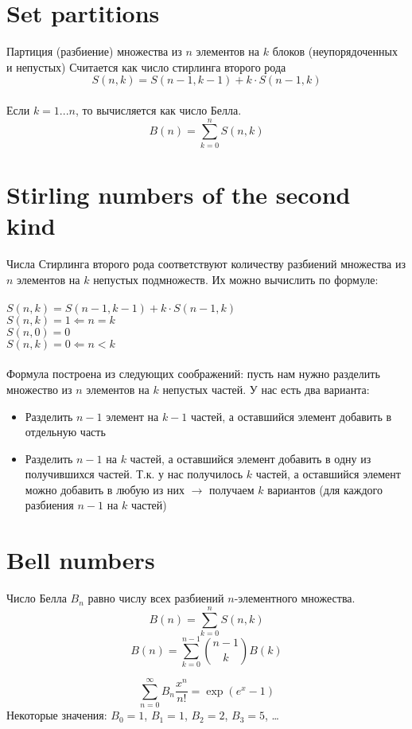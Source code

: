 \documentclass{article}
\begin{document}
	\section{Set partitions}
	Партиция (разбиение) множества из $n$ элементов на $k$ блоков (неупорядоченных и непустых) Считается как число стирлинга второго рода
	\[S(n,k) = S(n-1,k-1) + k \cdot S(n-1, k)\]
	\\
	Если $k = 1...n$, то вычисляется как число Белла.
	\[B(n) = \sum_{k=0}^{n} S(n,k)\]
	
	\section{Stirling numbers of the second kind}
	Числа Стирлинга второго рода соответствуют количеству разбиений множества из $n$ элементов на $k$ непустых подмножеств. Их можно вычислить по формуле:\\
	\\
	\(S(n,k) = S(n-1,k-1) + k \cdot S(n-1, k)\)\\
	\(S(n,k) = 1 \Leftarrow n = k\)\\
	\(S(n,0) = 0\)\\
	\(S(n,k) = 0 \Leftarrow n < k\)\\
	\\
	Формула построена из следующих соображений: пусть нам нужно разделить множество из $n$ элементов на $k$ непустых частей. У нас есть два варианта:
	\begin{itemize}
		\item Разделить $n - 1$ элемент на $k - 1$ частей, а оставшийся элемент добавить в отдельную часть
		\item Разделить $n - 1$ на $k$ частей, а оставшийся элемент добавить в одну из получившихся частей. Т.к. у нас получилось $k$ частей, а оставшийся элемент можно добавить в любую из них $\to$ получаем $k$ вариантов (для каждого разбиения $n - 1$ на $k$ частей)
	\end{itemize}
	
	
	\section{Bell numbers}
	Число Белла $B_n$ равно числу всех разбиений $n$-элементного множества.
	\[B(n) = \sum_{k=0}^{n} S(n,k)\]
	\[B(n) = \sum_{k=0}^{n-1} \binom{n-1}{k}B(k)\]
	
	\[\sum_{n=0}^\infty B_n \frac{x^n}{n!} = \exp(e^x - 1)\]
	Некоторые значения: $B_0=1$, $B_1=1$, $B_2=2$, $B_3=5$, \dots
	
\end{document}
